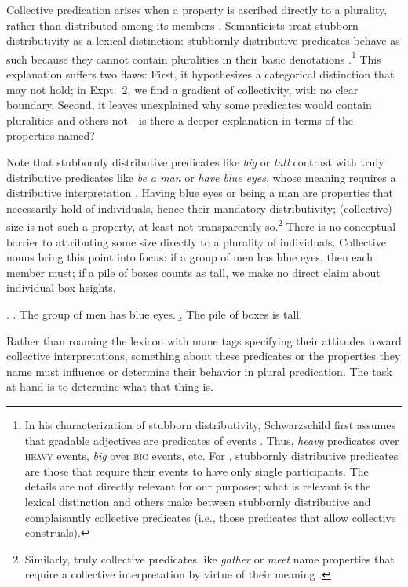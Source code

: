\documentclass[preprint,12pt,authoryear,titlepage]{elsarticle}
\begin{document}
Collective predication arises when a property is ascribed directly to a plurality, rather than distributed among its members \citep{link1983}. Semanticists treat stubborn distributivity as a lexical distinction: stubbornly distributive predicates behave as such because they cannot contain pluralities in their basic denotations  \citep{schwarzschild2011,vazquezrojas2012,zhang2013}.\footnote{In his characterization of stubborn distributivity, Schwarzschild first assumes that gradable adjectives are predicates of events \citep[e.g.,][]{higginbothamschein1989}. Thus, \emph{heavy} predicates over \textsc{heavy} events, \emph{big} over \textsc{big} events, etc. For \citeauthor{schwarzschild2011}, stubbornly distributive predicates are those that require their events to have only single participants. The details are not directly relevant for our purposes; what is relevant is the lexical distinction \citeauthor{schwarzschild2011} and others make between stubbornly distributive and complaisantly collective predicates (i.e., those predicates that allow collective construals).}
This explanation suffers two flaws:
First, it hypothesizes a categorical distinction that may not hold; in Expt.~2, we find a gradient of collectivity, with no clear boundary.
Second, it leaves unexplained why some predicates would contain pluralities and others not---is there a deeper explanation in terms of the properties named?

Note that stubbornly distributive predicates like \emph{big} or \emph{tall} contrast with truly distributive predicates like \emph{be a man} or \emph{have blue eyes}, whose meaning requires a distributive interpretation \citep{link1983}. Having blue eyes or being a man are properties that necessarily hold of individuals, hence their mandatory distributivity; (collective) size is not such a property, at least not transparently so.\footnote{Similarly, truly collective predicates like \emph{gather} or \emph{meet} name properties that require a collective interpretation by virtue of their meaning \citep{schwarzschild1994}.} There is no conceptual barrier to attributing some size directly to a plurality of individuals. Collective nouns bring this point into focus: if a group of men has blue eyes, then each member must; if a pile of boxes counts as tall, we make no direct claim about individual box heights. 

\ex. \a. The group of men has blue eyes. 
	\b. The pile of boxes is tall.

Rather than roaming the lexicon with name tags specifying their attitudes toward collective interpretations, something about these predicates or the properties they name must influence or determine their behavior in plural predication. The task at hand is to determine what that thing is.
\end{document}

